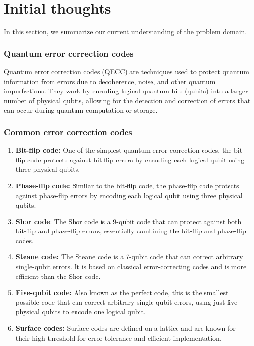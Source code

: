 \section{Initial thoughts}

In this section, we summarize our current understanding of the problem domain.

\subsubsection*{Quantum error correction codes}

Quantum error correction codes (QECC) are techniques used to protect quantum information from errors
due to decoherence, noise, and other quantum imperfections. They work by encoding logical quantum
bits (qubits) into a larger number of physical qubits, allowing for the detection and correction of
errors that can occur during quantum computation or storage.

\subsubsection*{Common error correction codes}

\begin{enumerate}
  \item \textbf{Bit-flip code:} One of the simplest quantum error correction codes, the bit-flip
  code protects against bit-flip errors by encoding each logical qubit using three physical qubits.

  \item \textbf{Phase-flip code:} Similar to the bit-flip code, the phase-flip code protects against
  phase-flip errors by encoding each logical qubit using three physical qubits.

  \item \textbf{Shor code:} The Shor code is a 9-qubit code that can protect against both bit-flip
  and phase-flip errors, essentially combining the bit-flip and phase-flip codes.

  \item \textbf{Steane code:} The Steane code is a 7-qubit code that can correct arbitrary
  single-qubit errors. It is based on classical error-correcting codes and is more efficient than
  the Shor code.

  \item \textbf{Five-qubit code:} Also known as the perfect code, this is the smallest possible code
  that can correct arbitrary single-qubit errors, using just five physical qubits to encode one
  logical qubit.

  \item \textbf{Surface codes:} Surface codes are defined on a lattice and are known for their high
  threshold for error tolerance and efficient implementation.
\end{enumerate}


